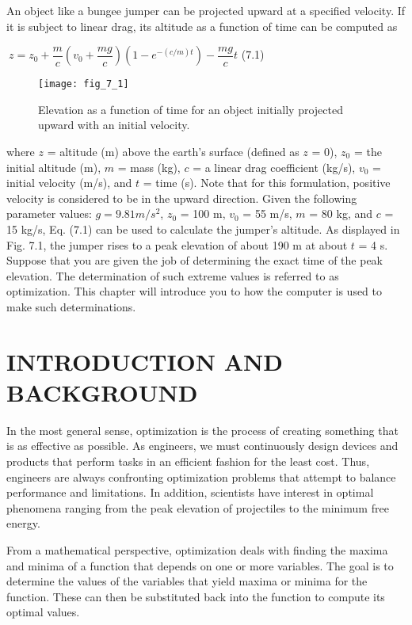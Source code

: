 \documentclass[../main.tex]{subfiles}
\begin{document}
\smallskip
\color{black}
\normalsize{An object like a bungee jumper can be projected upward at a specified velocity. If it
is subject to linear drag, its altitude as a function of time can be computed as}
\smallskip
\begin{center}
\large{$\ z=z_0+\dfrac{m}{c}(v_0+\dfrac{mg}{c})(1-e^{-(c/m)t})-\dfrac{mg}{c}t$} \hfill {(7.1)}
\normalsize
\end{center}
\begin{figure}[H]
	\centering
	\texttt{[image: fig\_7\_1]}
	\caption{\textsf{Elevation as a function of time for an object initially projected upward with an initial velocity.}}
	\label{fig:fig_7_1}
\end{figure}
where $z$ = altitude (m) above the earth's surface (defined as $z$ = 0), $z_0$ = the initial altitude
(m), $m$ = mass (kg), $c$ = a linear drag coefficient (kg/s), $v_0$ = initial velocity (m/s), and $t$ =
time (s). Note that for this formulation, positive velocity is considered to be in the upward
direction. Given the following parameter values: $g = 9.81 m/s^2$, $z_0$ = 100 m, $v_0$ = 55 m/s,
$m$ = 80 kg, and $c$ = 15 kg/s, Eq. (7.1) can be used to calculate the jumper's altitude. As
displayed in Fig. 7.1, the jumper rises to a peak elevation of about 190 m at about $t$ = 4 s.
Suppose that you are given the job of determining the exact time of the peak elevation.
The determination of such extreme values is referred to as optimization. This chapter will
introduce you to how the computer is used to make such determinations.\bigskip

\section{INTRODUCTION AND BACKGROUND}
\label{sec:sec_7_1}

In the most general sense, optimization is the process of creating something that is as
effective as possible. As engineers, we must continuously design devices and products that
perform tasks in an efficient fashion for the least cost. Thus, engineers are always confronting
optimization problems that attempt to balance performance and limitations. In
addition, scientists have interest in optimal phenomena ranging from the peak elevation of
projectiles to the minimum free energy.

From a mathematical perspective, optimization deals with finding the maxima and
minima of a function that depends on one or more variables. The goal is to determine the
values of the variables that yield maxima or minima for the function. These can then be
substituted back into the function to compute its optimal values.
\end{document}
